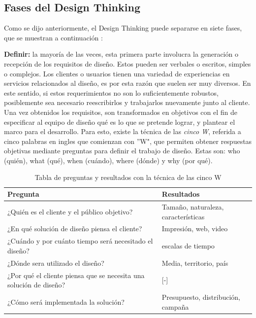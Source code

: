 \subsection{Fases del Design Thinking}

Como se dijo anteriormente, el Design Thinking puede separarse en siete fases, que se muestran a continuación \parencite{ambrose2010}: 

\begin{description}
\item \textbf{Definir:} la mayoría de las veces, esta primera parte involucra la generación o recepción de los requisitos de diseño. Estos pueden ser verbales o escritos, simples o complejos. Los clientes o usuarios tienen una variedad de experiencias en servicios relacionados al diseño, es por esta razón que suelen ser muy diversos. En este sentido, si estos requerimientos no son lo suficientemente robustos, posiblemente sea necesario reescribirlos y trabajarlos nuevamente junto al cliente. Una vez obtenidos los requisitos, son transformados en objetivos con el fin de especificar al equipo de diseño qué es lo que se pretende lograr, y plantear el marco para el desarrollo. Para esto, existe la técnica de las \textit{cinco W}, referida a cinco palabras en ingles que comienzan con ''W", que permiten obtener respuestas objetivas mediante preguntas para definir el trabajo de diseño. Estas son: who (quién), what (qué), when (cuándo), where (dónde) y why (por qué).

\begin{table}[H]
\centering
\begin{tabular}{|p{6cm}|p{5cm}|}
\hline
Pregunta & Resultados \\
\hline
¿Quién es el cliente y el público objetivo? & Tamaño, naturaleza, características \\
\hline
¿En qué solución de diseño piensa el cliente?& Impresión, web, video \\
\hline
¿Cuándo y por cuánto tiempo será necesitado el diseño? & escalas de tiempo \\
\hline
¿Dónde sera utilizado el diseño? & Media, territorio, país \\
\hline
¿Por qué el cliente piensa que se necesita una solución de diseño? & [-] \\
\hline
¿Cómo será implementada la solución? & Presupuesto, distribución, campaña\\
\hline

\end{tabular}
\caption{Tabla de preguntas y resultados con la técnica de las cinco W \parencite{ambrose2010}}
\end{table}



\end{description}
